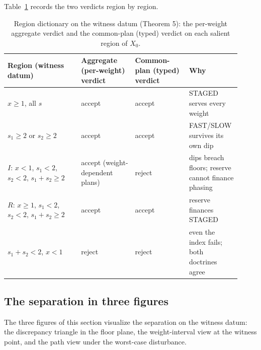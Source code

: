 \documentclass[3p,11pt]{elsarticle}
\begin{document}
Table~\ref{tab:regions} records the two verdicts region by region.

\begin{table}[htbp]
\centering
\small
\begin{tabular}{@{}p{0.30\linewidth}p{0.22\linewidth}p{0.22\linewidth}p{0.18\linewidth}@{}}
\toprule
Region (witness datum) & Aggregate (per-weight) verdict & Common-plan (typed) verdict & Why \\
\midrule
$x \ge 1$, all $s$ & accept & accept & STAGED serves every weight \\
$s_1 \ge 2$ or $s_2 \ge 2$ & accept & accept & FAST/SLOW survives its own dip \\
$I$: $x < 1$, $s_1 < 2$, $s_2 < 2$, $s_1 + s_2 \ge 2$ & accept (weight-dependent plans) & reject & dips breach floors; reserve cannot finance phasing \\
$R$: $x \ge 1$, $s_1 < 2$, $s_2 < 2$, $s_1 + s_2 \ge 2$ & accept & accept & reserve finances STAGED \\
$s_1 + s_2 < 2$, $x < 1$ & reject & reject & even the index fails; both doctrines agree \\
\bottomrule
\end{tabular}
\caption{Region dictionary on the witness datum (Theorem 5): the per-weight aggregate verdict and the common-plan (typed) verdict on each salient region of \(X_0\).}
\label{tab:regions}
\end{table}

\subsection{The separation in three figures}\label{figures}

The three figures of this section visualize the separation on the
witness datum: the discrepancy triangle in the floor plane, the
weight-interval view at the witness point, and the path view under the
worst-case disturbance.
\end{document}
